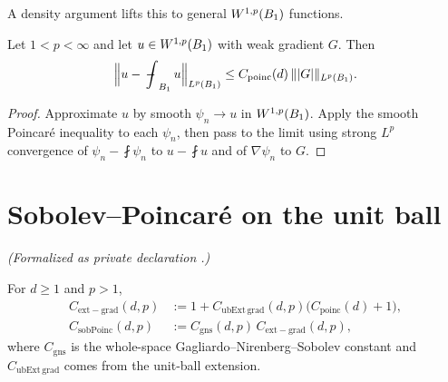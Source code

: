 A density argument lifts this to general $W^{1,p}(B_{1})$ functions.

\begin{theorem}
\label{thm:poincare_unitBall_W1p_public}
\leanok
{}
Let $1 < p < \infty$ and let $u \in W^{1,p}(B_{1})$ with weak gradient $G$. Then
\begin{equation*}
\Bigl\lVert u - \fint_{\Bz{1}} u \Bigr\rVert_{\Lp{p}(\Bz{1})}
\le C_{\mathrm{poinc}}(d)\, \lVert \lvert G\rvert\rVert_{\Lp{p}(\Bz{1})}.
\end{equation*}
\end{theorem}
\begin{proof}
\leanok
{}

Approximate $u$ by smooth $\psi_n \to u$ in $W^{1,p}(B_{1})$. Apply the smooth
Poincar\'e inequality to each $\psi_n$, then pass to the limit using strong $L^{p}$
convergence of $\psi_n - \fint \psi_n$ to $u - \fint u$ and of
$\nabla \psi_n$ to $G$.
\end{proof}

\section{Sobolev--Poincar\'e on the unit ball}

\begin{definition}
\label{def:C_extensionGrad}
\leanok
{}
\noindent\textit{(Formalized as private declaration .)}\par
For $d \ge 1$ and $p > 1$,
\begin{align*}
C_{\mathrm{ext\!-\!grad}}(d,p)
  &:= 1 + C_{\mathrm{ubExt\,grad}}(d,p)\bigl(C_{\mathrm{poinc}}(d) + 1\bigr),\\
C_{\mathrm{sobPoinc}}(d,p)
  &:= C_{\mathrm{gns}}(d,p)\, C_{\mathrm{ext\!-\!grad}}(d,p),
\end{align*}
where $C_{\mathrm{gns}}$ is the whole-space Gagliardo--Nirenberg--Sobolev constant and
$C_{\mathrm{ubExt\,grad}}$ comes from the unit-ball extension.
\end{definition}

